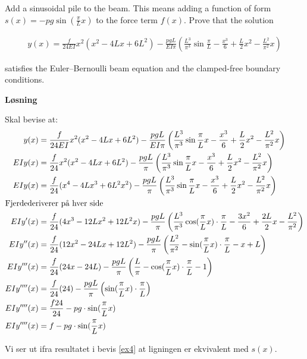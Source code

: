 %


Add a sinusoidal pile to the beam. This means adding a function of form $s(x)=-pg\sin(\frac{\pi}{L}x)$ to the force term $f(x)$. Prove that the solution

\begin{align}
y(x) = \frac{f}{{24EI}}{x^2}({x^2} - 4Lx + 6{L^2}) - \frac{{pgL}}{{EI\pi }}\left( {\frac{{{L^3}}}{{{\pi ^3}}}\sin \frac{\pi }{L} - \frac{{{x^3}}}{6} + \frac{L}{2}{x^2} - \frac{{{L^2}}}{{{\pi ^2}}}x} \right)
\end{align}

satisfies the Euler–Bernoulli beam equation and the clamped-free boundary conditions.

\vspace{5mm}
\textbf{Løsning}

Skal bevise at: 
\begin{align}
\label{ex4}
y(x) &= \frac{f}{{24EI}}{x^2}({x^2} - 4Lx + 6{L^2}) - \frac{{pgL}}{{EI\pi }}\left( {\frac{{{L^3}}}{{{\pi ^3}}}\sin \frac{\pi }{L}x - \frac{{{x^3}}}{6} + \frac{L}{2}{x^2} - \frac{{{L^2}}}{{{\pi ^2}}}x} \right)\nonumber\\ 
EIy(x) &= \frac{f}{{24}}{x^2}({x^2} - 4Lx + 6{L^2}) - \frac{{pgL}}{{\pi }}\left( {\frac{{{L^3}}}{{{\pi ^3}}}\sin \frac{\pi }{L}x - \frac{{{x^3}}}{6} + \frac{L}{2}{x^2} - \frac{{{L^2}}}{{{\pi ^2}}}x} \right)\nonumber\\
EIy(x) &= \frac{f}{{24}}({x^4} - 4Lx^3 + 6{L^2}{x^2}) - \frac{{pgL}}{{\pi }}\left( {\frac{{{L^3}}}{{{\pi ^3}}}\sin \frac{\pi }{L}x - \frac{{{x^3}}}{6} + \frac{L}{2}{x^2} - \frac{{{L^2}}}{{{\pi ^2}}}x} \right)\nonumber\\
\intertext{Fjerdederiverer på hver side}
EIy'(x) &= \frac{f}{{24}}(4{x^3} - 12Lx^2 + 12{L^2}x) - \frac{{pgL}}{{\pi }}\left( {\frac{{{L^3}}}{{{\pi ^3}}}\cos (\frac{\pi }{L}x) \cdot \frac{\pi}{L} - \frac{{{3x^2}}}{6} + \frac{2L}{2}x - \frac{{{L^2}}}{{{\pi ^2}}}} \right)\nonumber\\
EIy''(x) &= \frac{f}{{24}}(12{x^2} - 24Lx + 12{L^2}) - \frac{{pgL}}{{\pi }}\left( {\frac{{{L^2}}}{{{\pi ^2}}}-\sin (\frac{\pi }{L}x) \cdot \frac{\pi}{L} - x + L } \right)\nonumber\\
EIy'''(x) &= \frac{f}{{24}}(24x - 24L) - \frac{{pgL}}{{\pi }}\left( {\frac{{{L}}}{{{\pi}}}-\cos (\frac{\pi }{L}x) \cdot \frac{\pi}{L} - 1 } \right)\nonumber\\
EIy''''(x) &= \frac{f}{{24}}(24) - \frac{{pgL}}{{\pi }}\left( {\sin (\frac{\pi }{L}x) \cdot \frac{\pi}{L}  } \right)\nonumber\\
EIy''''(x) &= \frac{f24}{24} - {pg} \cdot{\sin (\frac{\pi }{L}x) } \nonumber\\
EIy''''(x) &= f - {pg} \cdot{\sin (\frac{\pi }{L}x) } \nonumber\\
\end{align}

Vi ser ut ifra resultatet i bevis \ref{ex4} at ligningen er ekvivalent med $s(x)$. 


%